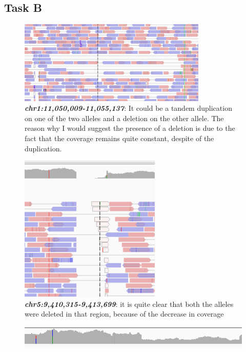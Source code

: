 \subsection{Task B}
\begin{figure}[H]
    \centering
    \includegraphics[width=0.8\textwidth]{pos1.PNG}
    \caption{\textit{\textbf{chr1:11,050,009-11,055,137}}: It could be a tandem
    duplication on one of the two alleles and a deletion on the other allele.
    The reason why I would suggest the presence of a deletion is due to the fact
    that the coverage remains quite constant, despite of the duplication.}
    \label{fig:task_B}
\end{figure}

\begin{figure}[H]
    \centering
    \includegraphics[width=0.6\textwidth]{pos2.PNG}
     \caption{\textbf{\textit{chr5:9,410,315-9,413,699}}: it is quite clear that both the alleles were deleted in that region, because of the decrease in coverage}
\end{figure}


\begin{figure}[H]
   \centering
   \includegraphics[width=1\textwidth]{cov3.PNG}
   \label{fig:cov3}
\end{figure}


